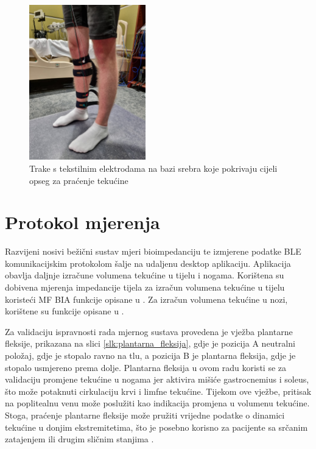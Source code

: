 \documentclass[../diplomski_rad.tex]{subfiles}
\begin{document}
\begin{figure}[htb]
    \centering
    \includegraphics[width=0.45\textwidth]{Figures/moje_noge.jpeg} 
    \caption{Trake s tekstilnim elektrodama na bazi srebra koje pokrivaju cijeli opseg za praćenje tekućine \cite{Bandur2023}}
    \label{slk:tekstilne_elektrode}
\end{figure}

\section{Protokol mjerenja}

Razvijeni nosivi bežični sustav mjeri bioimpedanciju te izmjerene podatke BLE komunikacijskim protokolom šalje na udaljenu desktop aplikaciju. 
Aplikacija obavlja daljnje izračune volumena tekućine u tijelu i nogama. 
Korištena su dobivena mjerenja impedancije tijela za izračun volumena tekućine u tijelu koristeći MF BIA funkcije opisane u \cite{Sanchez2013}. 
Za izračun volumena tekućine u nozi, korištene su funkcije opisane u \cite{Delano2022}.

Za validaciju ispravnosti rada mjernog sustava provedena je vježba plantarne fleksije, 
prikazana na slici \ref{slk:plantarna_fleksija}, gdje je pozicija A neutralni položaj, 
gdje je stopalo ravno na tlu, a pozicija B je plantarna fleksija, gdje je stopalo usmjereno prema dolje. 
Plantarna fleksija u ovom radu koristi se za validaciju promjene tekućine u nogama jer aktivira 
mišiće gastrocnemius i soleus, što može potaknuti cirkulaciju krvi i limfne tekućine. 
Tijekom ove vježbe, pritisak na poplitealnu venu može poslužiti kao indikacija promjena u volumenu tekućine. 
Stoga, praćenje plantarne fleksije može pružiti vrijedne podatke o dinamici tekućine u donjim ekstremitetima, 
što je posebno korisno za pacijente sa srčanim zatajenjem ili drugim sličnim stanjima \cite{AVILADEOLIVEIRA2022102625}. 
\end{document}
